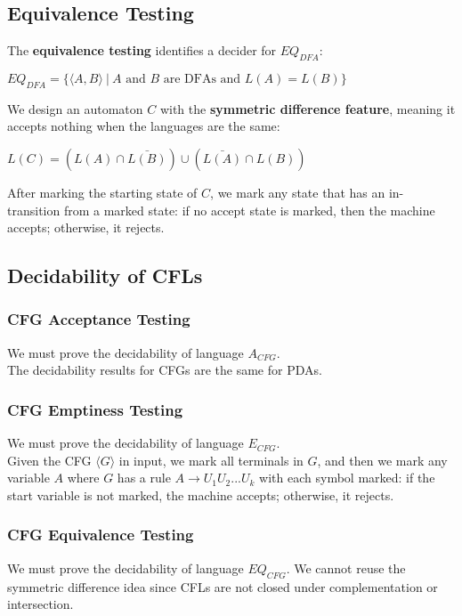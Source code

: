 \documentclass{article}
\begin{document}
\subsection{Equivalence Testing}
The \textbf{equivalence testing} identifies a decider for $EQ_{DFA}$:
\begin{center}
    $EQ_{DFA} = \{\langle A, B\rangle \ | \ A \text{ and } B \text{ are DFAs and }L(A) = L(B)\}$
\end{center}
We design an automaton $C$ with the \textbf{symmetric difference feature}, meaning it accepts nothing when the languages are the same:
\begin{center}
    $L(C) = (L(A) \cap \bar{L(B)}) \cup (\bar{L(A)} \cap L(B))$
\end{center}
After marking the starting state of $C$, we mark any state that has an in-transition from a marked state: if no accept state is marked, then the machine accepts; otherwise, it rejects.
\subsection{Decidability of CFLs}
\subsubsection{CFG Acceptance Testing}
We must prove the decidability of language $A_{CFG}$. \\
The decidability results for CFGs are the same for PDAs.
\subsubsection{CFG Emptiness Testing}
We must prove the decidability of language $E_{CFG}$. \\
Given the CFG $\langle G\rangle$ in input, we mark all terminals in $G$, and then we mark any variable $A$ where $G$ has a rule $A \rightarrow U_1U_2...U_k$ with each symbol marked: if the start variable is not marked, the machine accepts; otherwise, it rejects.
\subsubsection{CFG Equivalence Testing}
We must prove the decidability of language $EQ_{CFG}$. We cannot reuse the symmetric difference idea since CFLs are not closed under complementation or intersection.

\newpage

\end{document}
